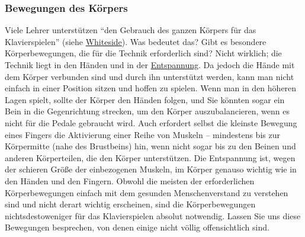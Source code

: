
\subsubsection{Bewegungen des Körpers}
\label{c1iii4c}

Viele Lehrer unterstützen \enquote{den Gebrauch des ganzen Körpers für das Klavierspielen} (siehe \hyperref[Whiteside]{Whiteside}).
Was bedeutet das?
Gibt es besondere Körperbewegungen, die für die Technik erforderlich sind?
Nicht wirklich; die Technik liegt in den Händen und in der \hyperref[c1ii14]{Entspannung}.
Da jedoch die Hände mit dem Körper verbunden sind und durch ihn unterstützt werden, kann man nicht einfach in einer Position sitzen und hoffen zu spielen.
Wenn man in den höheren Lagen spielt, sollte der Körper den Händen folgen, und Sie könnten sogar ein Bein in die Gegenrichtung strecken, um den Körper auszubalancieren, wenn es nicht für die Pedale gebraucht wird.
Auch erfordert selbst die kleinste Bewegung eines Fingers die Aktivierung einer Reihe von Muskeln -- mindestens bis zur Körpermitte (nahe des Brustbeins) hin, wenn nicht sogar bis zu den Beinen und anderen Körperteilen, die den Körper unterstützen.
Die Entspannung ist, wegen der schieren Größe der einbezogenen Muskeln, im Körper genauso wichtig wie in den Händen und den Fingern.
Obwohl die meisten der erforderlichen Körperbewegungen einfach mit dem gesunden Menschenverstand zu verstehen sind und nicht derart wichtig erscheinen, sind die Körperbewegungen nichtsdestoweniger für das Klavierspielen absolut notwendig.
Lassen Sie uns diese Bewegungen besprechen, von denen einige nicht völlig offensichtlich sind.

